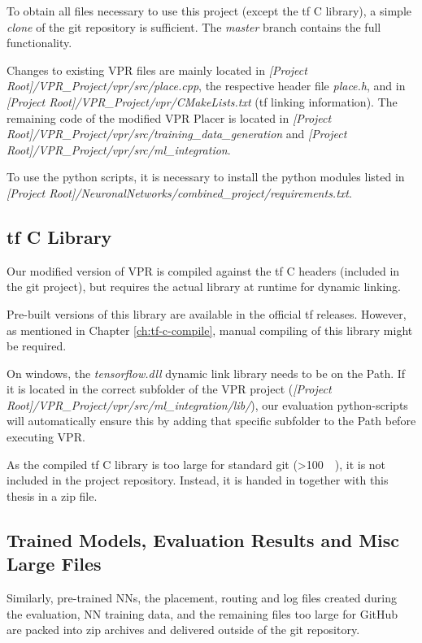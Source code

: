 To obtain all files necessary to use this project (except the \gls{tf} C library), a simple \textit{clone} of the git repository is sufficient. The \textit{master} branch contains the full functionality.

Changes to existing \gls{VPR} files are mainly located in \textit{[Project Root]/VPR\_Project/vpr/src/place.cpp}, the respective header file \textit{place.h}, and in \textit{[Project Root]/VPR\_Project/vpr/CMakeLists.txt} (\gls{tf} linking information). The remaining code of the modified \gls{VPR} Placer is located in \textit{[Project Root]/VPR\_Project/vpr/src/training\_data\_generation} and \textit{[Project Root]/VPR\_Project/vpr/src/ml\_integration}.

To use the python scripts, it is necessary to install the python modules listed in \textit{[Project Root]/NeuronalNetworks/combined\_project/requirements.txt}.

\subsection{\gls{tf} C Library}

Our modified version of \gls{VPR} is compiled against the \gls{tf} C headers (included in the git project), but requires the actual library at runtime for dynamic linking.

Pre-built versions of this library are available in the official \gls{tf} releases. However, as mentioned in Chapter \ref{ch:tf-c-compile}, manual compiling of this library might be required.

On windows, the \textit{tensorflow.dll} dynamic link library needs to be on the Path. If it is located in the correct subfolder of the \gls{VPR} project (\textit{[Project Root]/VPR\_Project/vpr/src/ml\_integration/lib/}), our evaluation python-scripts will automatically ensure this by adding that specific subfolder to the Path before executing \gls{VPR}.

As the compiled \gls{tf} C library is too large for standard git (>\SI{100}{\mega\byte}), it is not included in the project repository. Instead, it is handed in together with this thesis in a zip file.

\subsection{Trained Models, Evaluation Results and Misc Large Files}

Similarly, pre-trained \glspl{NN}, the placement, routing and log files created during the evaluation, \gls{NN} training data, and the remaining files too large for GitHub are packed into zip archives and delivered outside of the git repository.

